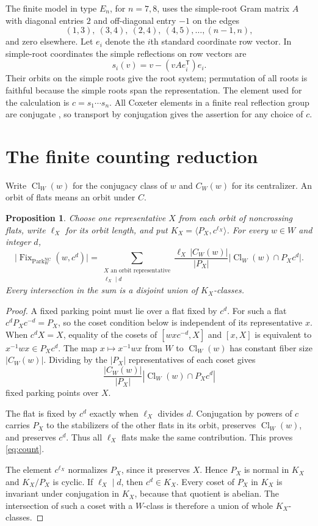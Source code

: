\documentclass[11pt]{article}
\newtheorem{proposition}[theorem]{Proposition}
\newcommand{\NC}{\operatorname{NC}}
\newcommand{\Fix}{\operatorname{Fix}}
\newcommand{\Park}{\operatorname{Park}}
\newcommand{\Cl}{\operatorname{Cl}}
\begin{document}
The finite model in type $E_n$, for $n=7,8$, uses the simple-root
Gram matrix $A$ with diagonal entries $2$ and off-diagonal entry $-1$
on the edges
\[
 (1,3),\ (3,4),\ (2,4),\ (4,5),\ldots,(n-1,n),
\]
and zero elsewhere. Let $e_i$ denote the $i$th standard coordinate row
vector. In simple-root coordinates the simple reflections
on row vectors are
\[
 s_i(v)=v-(vAe_i^{\mathsf T})e_i.
\]
Their orbits on the simple roots give the root system; permutation of
all roots is faithful because the simple roots span the representation.
The element used for the calculation is $c=s_1\cdots s_n$. All
Coxeter elements in a finite real reflection group are conjugate
\cite[Section~2.1]{ARR}, so
transport by conjugation gives the assertion for any choice of $c$.

\section{The finite counting reduction}\label{sec:reduction}
Write $\Cl_W(w)$ for the conjugacy class of $w$ and $C_W(w)$ for
its centralizer. An orbit of flats means an orbit under $C$.

\begin{proposition}\label{prop:count}
Choose one representative $X$ from each orbit of noncrossing flats,
write $\ell_X$ for its orbit length, and put
$K_X=\langle P_X,c^{\ell_X}\rangle$. For every $w\in W$ and integer
$d$,
\begin{equation}\label{eq:count}
 \bigl|\Fix_{\Park^{\NC}_W}(w,c^d)\bigr|
 =\sum_{\substack{X\text{ an orbit representative}\\\ell_X\mid d}}
   \frac{\ell_X\,|C_W(w)|}{|P_X|}
   \bigl|\Cl_W(w)\cap P_Xc^d\bigr|.
\end{equation}
Every intersection in the sum is a disjoint union of $K_X$-classes.
\end{proposition}

\begin{proof}
A fixed parking point must lie over a flat fixed by $c^d$. For such a
flat $c^dP_Xc^{-d}=P_X$, so the coset condition below is independent of
its representative $x$. When
$c^dX=X$, equality of the cosets of $[wxc^{-d},X]$ and $[x,X]$
is equivalent to $x^{-1}wx\in P_Xc^d$. The map
$x\mapsto x^{-1}wx$ from $W$ to $\Cl_W(w)$ has constant fiber size
$|C_W(w)|$. Dividing by the $|P_X|$ representatives of each coset
gives
\[
 \frac{|C_W(w)|}{|P_X|}|\Cl_W(w)\cap P_Xc^d|
\]
fixed parking points over $X$.

The flat is fixed by $c^d$ exactly when $\ell_X$ divides $d$.
Conjugation by powers of $c$ carries $P_X$ to the stabilizers of the
other flats in its orbit, preserves $\Cl_W(w)$, and preserves $c^d$.
Thus all $\ell_X$ flats make the same contribution. This proves
\eqref{eq:count}.

The element $c^{\ell_X}$ normalizes $P_X$, since it preserves $X$.
Hence $P_X$ is normal in $K_X$ and $K_X/P_X$ is cyclic. If
$\ell_X\mid d$, then $c^d\in K_X$. Every coset of $P_X$ in $K_X$
is invariant under conjugation in $K_X$, because that quotient is
abelian. The intersection of such a coset with a $W$-class is therefore
a union of whole $K_X$-classes.
\end{proof}
\end{document}
